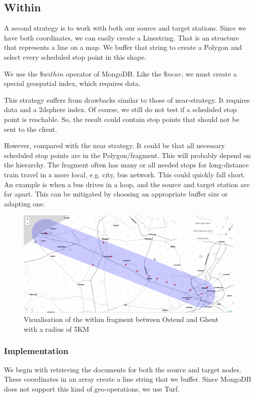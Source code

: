 \subsection{Within}
A second strategy is to work with both our source and target stations. Since we have both coordinates, we can easily create a Linestring. That is an  structure that represents a line on a map. We buffer that string to create a Polygon and select every scheduled stop point in this shape.

We use the $\$within$ \cite{noauthor_geowithin_nodate} operator of MongoDB. Like the $\$near$, we must create a special geospatial index, which requires  data.

This strategy suffers from drawbacks similar to those of near-strategy. It requires  data and a 2dsphere index. Of course, we still do not test if a scheduled stop point is reachable. So, the result could contain stop points that should not be sent to the client. 

However, compared with the near strategy. It could be that all necessary scheduled stop points are in the Polygon/fragment. This will probably depend on the hierarchy. The fragment often has many or all needed stops for long-distance train travel in a more local, e.g. city, bus network. This could quickly fall short. An example is when a bus drives in a loop, and the source and target station are far apart. This can be mitigated by choosing an appropriate buffer size or adapting one.

\begin{figure}[H]
    \centering
    \includegraphics[width=\textwidth]{images/within visualized.png}
    \caption{Visualisation of the within fragment between Ostend and Ghent with a radius of 5KM}
    \label{fig:within-visualized}
\end{figure}

\subsubsection{Implementation}
We begin with retrieving the documents for both the source and target nodes. These coordinates in an array create a line string that we buffer. Since MongoDB does not support this kind of geo-operations, we use Turf\cite{noauthor_turfjs_nodate}.

